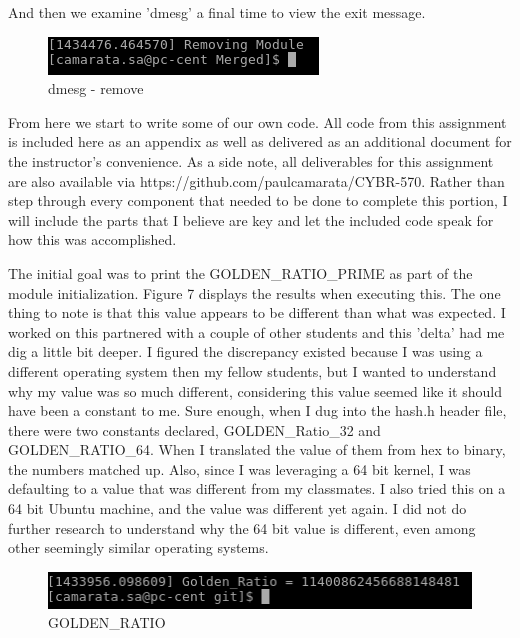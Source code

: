 \documentclass[10pt]{article}
\begin{document}
And then we examine 'dmesg' a final time to view the exit message.

\begin{figure}[!h]
\centering
\includegraphics[scale=0.5]{./images/ss6.png}
\caption{dmesg - remove}
\label{fig:Code}
\end{figure}

\pagebreak

From here we start to write some of our own code.  All code from this assignment is included here as an appendix as well as delivered as an additional document for the instructor's convenience.  As a side note, all deliverables for this assignment are also available via https://github.com/paulcamarata/CYBR-570.  Rather than step through every component that needed to be done to complete this portion, I will include the parts that I believe are key and let the included code speak for how this was accomplished.

The initial goal was to print the GOLDEN\_RATIO\_PRIME as part of the module initialization.  Figure 7 displays the results when executing this.  The one thing to note is that this value appears to be different than what was expected.  I worked on this partnered with a couple of other students and this 'delta' had me dig a little bit deeper.  I figured the discrepancy existed because I was using a different operating system then my fellow students, but I wanted to understand why my value was so much different, considering this value seemed like it should have been a constant to me.  Sure enough, when I dug into the hash.h header file, there were two constants declared, GOLDEN\_Ratio\_32 and GOLDEN\_RATIO\_64.  When I translated the value of them from hex to binary, the numbers matched up.  Also, since I was leveraging a 64 bit kernel, I was defaulting to a value that was different from my classmates.  I also tried this on a 64 bit Ubuntu machine, and the value was different yet again.  I did not do further research to understand why the 64 bit value is different, even among other seemingly similar operating systems.

\begin{figure}[!h]
\centering
\includegraphics[scale=0.5]{./images/ss7.png}
\caption{GOLDEN\_RATIO}
\label{fig:Code}
\end{figure}
\end{document}
